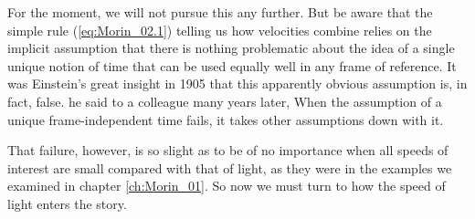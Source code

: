 For the moment, we will not pursue this any further. But be aware that the simple rule 
(\ref{eq:Morin_02.1}) telling us how velocities combine relies on the implicit assumption that there is nothing problematic about the idea of a single unique notion of time that can be used equally well in any frame of reference. It was Einstein's great insight in 1905 that this apparently obvious assumption is, in fact, false.  he said to a colleague many years later,  When the assumption of a unique frame-independent time fails, it takes other  assumptions down with it. 

That failure, however, is so slight as to be of no importance when all speeds of interest are small compared with that of light, as they were in the examples we examined in chapter \ref{ch:Morin_01}. So now we must turn to how the speed of light enters the story.  